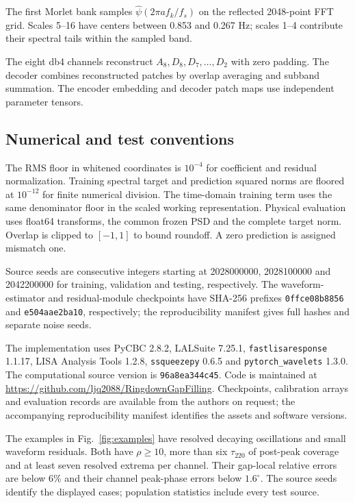 \documentclass[10pt,prd,aps,a4paper,twocolumn,superscriptaddress,nofootinbib,floatfix]{revtex4-2}
\begin{document}
The first Morlet bank samples $\widehat\psi(2\pi a f_k/f_s)$ on the reflected 2048-point FFT grid. Scales 5--16 have centers between 0.853 and 0.267 Hz; scales 1--4 contribute their spectral tails within the sampled band.

The eight db4 channels reconstruct $A_8,D_8,D_7,\ldots,D_2$ with zero padding. The decoder combines reconstructed patches by overlap averaging and subband summation. The encoder embedding and decoder patch maps use independent parameter tensors.

\subsection{Numerical and test conventions}
The RMS floor in whitened coordinates is $10^{-4}$ for coefficient and residual normalization. Training spectral target and prediction squared norms are floored at $10^{-12}$ for finite numerical division. The time-domain training term uses the same denominator floor in the scaled working representation. Physical evaluation uses float64 transforms, the common frozen PSD and the complete target norm. Overlap is clipped to $[-1,1]$ to bound roundoff. A zero prediction is assigned mismatch one.

Source seeds are consecutive integers starting at 2028000000, 2028100000 and 2042200000 for training, validation and testing, respectively. The waveform-estimator and residual-module checkpoints have SHA-256 prefixes \texttt{0ffce08b8856} and \texttt{e504aae2ba10}, respectively; the reproducibility manifest gives full hashes and separate noise seeds.

The implementation uses PyCBC 2.8.2, LALSuite 7.25.1, \texttt{fastlisaresponse} 1.1.17, LISA Analysis Tools 1.2.8, \texttt{ssqueezepy} 0.6.5 and \texttt{pytorch\_wavelets} 1.3.0. The computational source version is \texttt{96a8ea344c45}. Code is maintained at \url{https://github.com/ljq2088/RingdownGapFilling}. Checkpoints, calibration arrays and evaluation records are available from the authors on request; the accompanying reproducibility manifest identifies the assets and software versions.

The examples in Fig.~\ref{fig:examples} have resolved decaying oscillations and small waveform residuals. Both have $\rho\ge10$, more than six $\tau_{220}$ of post-peak coverage and at least seven resolved extrema per channel. Their gap-local relative errors are below 6\% and their channel peak-phase errors below $1.6^\circ$. The source seeds identify the displayed cases; population statistics include every test source.
\end{document}
